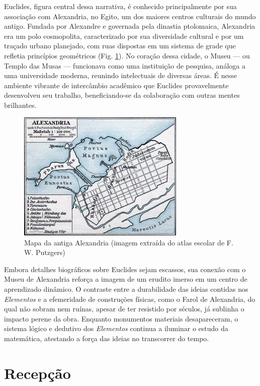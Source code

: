 \documentclass{hipatia}
\begin{document}
Euclides, figura central dessa narrativa, é
conhecido principalmente por sua associação com
Alexandria, no Egito, um dos maiores centros
culturais do mundo antigo. Fundada por Alexandre
e governada pela dinastia ptolomaica,
Alexandria era um polo cosmopolita, caracterizado
por sua diversidade cultural e por um traçado
urbano planejado, com ruas dispostas em um sistema
de grade que refletia princípios geométricos (Fig. \ref{fig:Mapa}). No
coração dessa cidade, o Museu --- ou Templo das
Musas --- funcionava como uma instituição de
pesquisa, análoga a uma universidade moderna,
reunindo intelectuais de diversas áreas. É nesse
ambiente vibrante de intercâmbio acadêmico que
Euclides provavelmente desenvolveu seu trabalho,
beneficiando-se da colaboração com outras mentes
brilhantes.

\begin{figure}[htb!]
\begin{center}
\includegraphics[width=8cm]{Mapa.jpg}
\end{center}
\caption{\label{fig:Mapa}
Mapa da antiga Alexandria (imagem extraída do atlas escolar de F. W. Putzgers)}   
\end{figure}

Embora detalhes biográficos sobre Euclides sejam
escassos, sua conexão com o Museu de Alexandria
reforça a imagem de um erudito imerso em um centro
de aprendizado dinâmico. O contraste entre a
durabilidade das ideias contidas nos \emph{Elementos} e a
efemeridade de construções físicas, como o Farol
de Alexandria, do qual não sobram nem ruínas,
apesar de ter resistido por séculos, já sublinha o
impacto perene da obra. Enquanto monumentos
materiais desapareceram, o sistema lógico e
dedutivo dos \emph{Elementos} continua a iluminar o
estudo da matemática, atestando a força das ideias
no transcorrer do tempo.

\section{Recepção}
\end{document}
